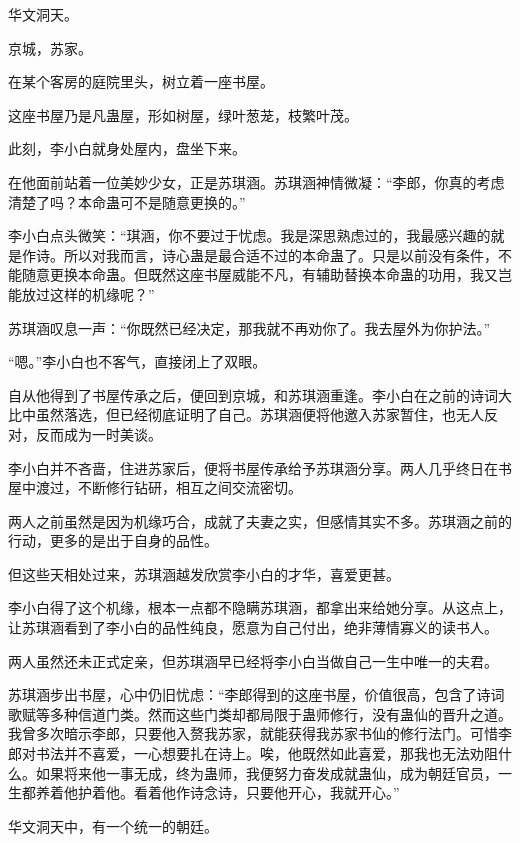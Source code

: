 
\begin{this_body}

华文洞天。

京城，苏家。

在某个客房的庭院里头，树立着一座书屋。

这座书屋乃是凡蛊屋，形如树屋，绿叶葱茏，枝繁叶茂。

此刻，李小白就身处屋内，盘坐下来。

在他面前站着一位美妙少女，正是苏琪涵。苏琪涵神情微凝：“李郎，你真的考虑清楚了吗？本命蛊可不是随意更换的。”

李小白点头微笑：“琪涵，你不要过于忧虑。我是深思熟虑过的，我最感兴趣的就是作诗。所以对我而言，诗心蛊是最合适不过的本命蛊了。只是以前没有条件，不能随意更换本命蛊。但既然这座书屋威能不凡，有辅助替换本命蛊的功用，我又岂能放过这样的机缘呢？”

苏琪涵叹息一声：“你既然已经决定，那我就不再劝你了。我去屋外为你护法。”

“嗯。”李小白也不客气，直接闭上了双眼。

自从他得到了书屋传承之后，便回到京城，和苏琪涵重逢。李小白在之前的诗词大比中虽然落选，但已经彻底证明了自己。苏琪涵便将他邀入苏家暂住，也无人反对，反而成为一时美谈。

李小白并不吝啬，住进苏家后，便将书屋传承给予苏琪涵分享。两人几乎终日在书屋中渡过，不断修行钻研，相互之间交流密切。

两人之前虽然是因为机缘巧合，成就了夫妻之实，但感情其实不多。苏琪涵之前的行动，更多的是出于自身的品性。

但这些天相处过来，苏琪涵越发欣赏李小白的才华，喜爱更甚。

李小白得了这个机缘，根本一点都不隐瞒苏琪涵，都拿出来给她分享。从这点上，让苏琪涵看到了李小白的品性纯良，愿意为自己付出，绝非薄情寡义的读书人。

两人虽然还未正式定亲，但苏琪涵早已经将李小白当做自己一生中唯一的夫君。

苏琪涵步出书屋，心中仍旧忧虑：“李郎得到的这座书屋，价值很高，包含了诗词歌赋等多种信道门类。然而这些门类却都局限于蛊师修行，没有蛊仙的晋升之道。我曾多次暗示李郎，只要他入赘我苏家，就能获得我苏家书仙的修行法门。可惜李郎对书法并不喜爱，一心想要扎在诗上。唉，他既然如此喜爱，那我也无法劝阻什么。如果将来他一事无成，终为蛊师，我便努力奋发成就蛊仙，成为朝廷官员，一生都养着他护着他。看着他作诗念诗，只要他开心，我就开心。”

华文洞天中，有一个统一的朝廷。


\end{this_body}
